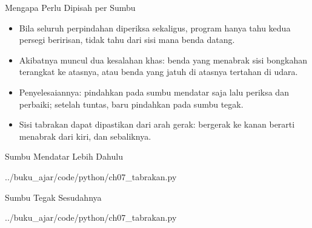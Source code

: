 \documentclass[aspectratio=169,10pt]{beamer}
\begin{document}
\begin{frame}{Mengapa Perlu Dipisah per Sumbu}
\begin{center}
\end{center}
\vspace{-0.04cm}
\begin{itemize}
  \item Bila seluruh perpindahan diperiksa sekaligus, program hanya tahu kedua
        persegi beririsan, tidak tahu dari sisi mana benda datang.
  \item Akibatnya muncul dua kesalahan khas: benda yang menabrak sisi
        bongkahan terangkat ke atasnya, atau benda yang jatuh di atasnya
        tertahan di udara.
  \item Penyelesaiannya: pindahkan pada sumbu mendatar saja lalu periksa dan
        perbaiki; setelah tuntas, baru pindahkan pada sumbu tegak.
  \item Sisi tabrakan dapat dipastikan dari arah gerak: bergerak ke kanan
        berarti menabrak dari kiri, dan sebaliknya.
\end{itemize}
\end{frame}

\begin{frame}[fragile]{Sumbu Mendatar Lebih Dahulu}

  {../buku_ajar/code/python/ch07_tabrakan.py}
\end{frame}

\begin{frame}[fragile]{Sumbu Tegak Sesudahnya}

  {../buku_ajar/code/python/ch07_tabrakan.py}
\end{frame}

\end{document}
